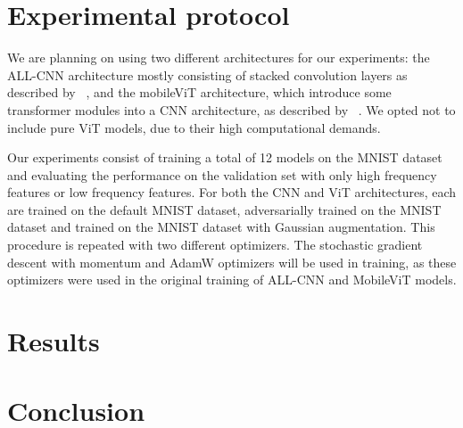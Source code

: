 \documentclass{article}
\begin{document}
\section{Experimental protocol}
We are planning on using two different architectures for our
experiments: the ALL-CNN architecture mostly consisting of stacked
convolution layers as described by ~\citep{springenberg2015striving}, and the
mobileViT architecture, which introduce some transformer modules into
a CNN architecture, as described by ~\citep{mehta2022mobilevit}. We
opted not to include pure ViT models, due to their high computational
demands.

Our experiments consist of training a total of 12 models on the MNIST
dataset and evaluating the performance on the validation set with only
high frequency features or low frequency features. For both the CNN
and ViT architectures, each are trained on the default MNIST dataset,
adversarially trained on the MNIST dataset and trained on the MNIST
dataset with Gaussian augmentation. This procedure is repeated with
two different optimizers. The stochastic gradient descent with
momentum and AdamW optimizers will be used in training, as these
optimizers were used in the original training of ALL-CNN and MobileViT
models.

\section{Results}

\section{Conclusion}



\end{document}
